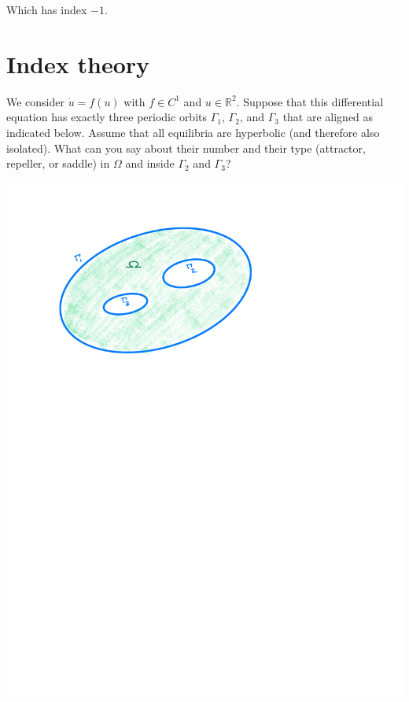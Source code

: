 \documentclass[12pt]{article}
\newcommand{\R}{\mathbb{R}}
\begin{document}
\begin{enumerate}[(i)]
\begin{center}
          \end{center}

          Which has index $-1$.

\end{enumerate}

\pagebreak

\section{Index theory}

We consider $\dot{u}=f(u)$ with $f\in C^1$ and $u\in\R^2$. Suppose that this differential equation has exactly three periodic orbits $\Gamma_1$, $\Gamma_2$, and $\Gamma_3$ that are aligned as indicated below. Assume that all equilibria are hyperbolic (and therefore also isolated). What can you say about their number and their type (attractor, repeller, or saddle) in $\Omega$ and inside $\Gamma_2$ and $\Gamma_3$?

\centerline{\includegraphics[scale=0.8]{Assignment_Figure_5.pdf}}
\end{document}
